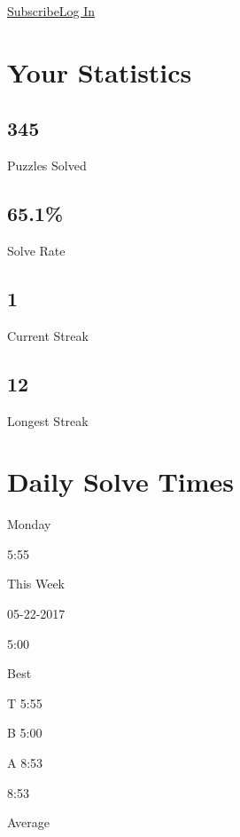 \href{https://www.nytimes.com/subscription/games?campaignId=4QHQ8}{Subscribe}\href{https://myaccount.nytimes.com/auth/login?redirect_uri=https\%3A\%2F\%2Fwww.nytimes.com\%2Fpuzzles\%2Fstats\&response_type=cookie\&client_id=games\&application=crosswords\&asset=navigation-bar}{Log
In}

\hypertarget{your-statistics}{%
\section{Your Statistics}\label{your-statistics}}

\hypertarget{345}{%
\subsection{345}\label{345}}

Puzzles Solved

\hypertarget{651}{%
\subsection{65.1\%}\label{651}}

Solve Rate

\hypertarget{1}{%
\subsection{1}\label{1}}

Current Streak

\hypertarget{12}{%
\subsection{12}\label{12}}

Longest Streak

\hypertarget{daily-solve-times}{%
\section{Daily Solve Times}\label{daily-solve-times}}

Monday

5:55

This Week

05-22-2017

5:00

Best

T 5:55

B 5:00

A 8:53

8:53

Average

